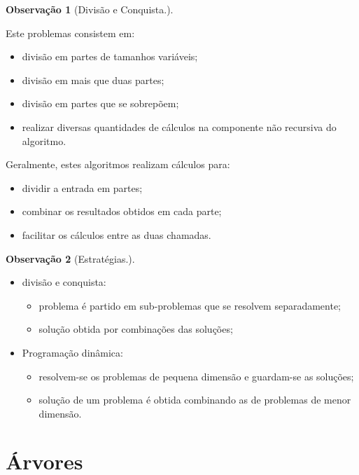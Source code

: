 \documentclass[a4paper, 12pt]{article}
\newtheorem{remark}{Observação}
\begin{document}
\begin{remark}[Divisão e Conquista.]\end{remark}
    Este problemas consistem em:
    \begin{itemize}
        \item divisão em partes de tamanhos variáveis;
        \item divisão em mais que duas partes;
        \item divisão em partes que se sobrepõem;
        \item realizar diversas quantidades de cálculos na componente não recursiva do algoritmo.
    \end{itemize}

    Geralmente, estes algoritmos realizam cálculos para:
    \begin{itemize}
        \item dividir a entrada em partes;
        \item combinar os resultados obtidos em cada parte;
        \item facilitar os cálculos entre as duas chamadas.
    \end{itemize}

\begin{remark}[Estratégias.]\end{remark}
    \begin{itemize}
        \item divisão e conquista:
        \begin{itemize}
            \item problema é partido em sub-problemas que se resolvem separadamente;
            \item solução obtida por combinações das soluções;
        \end{itemize}
        \item Programação dinâmica:
        \begin{itemize}
            \item  resolvem-se os problemas de pequena dimensão e guardam-se as soluções;
            \item solução de um problema é obtida combinando as de problemas de menor dimensão.
        \end{itemize}
    \end{itemize}

\newpage

\section{Árvores}
\end{document}
